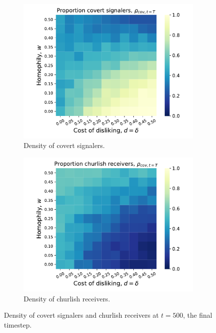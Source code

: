 \documentclass[11pt,letterpaper]{article}
\begin{document}
\begin{figure}[H]
  \centering
  \begin{subfigure}{0.49\textwidth}
    \centering
    \includegraphics[width=\textwidth]{Figures/basic_disliking_signaling.pdf}
    \caption{Density of covert signalers.}
  \end{subfigure}
  \begin{subfigure}{0.49\textwidth}
    \centering
    \includegraphics[width=\textwidth]{Figures/basic_disliking_receiving.pdf}
    \caption{Density of churlish receivers.}
  \end{subfigure}
  
  \caption{Density of covert signalers and churlish receivers at $t=500$, 
    the final timestep.}
  \label{fig:dislikingHomophilyHeatmap}
\end{figure}
\end{document}
